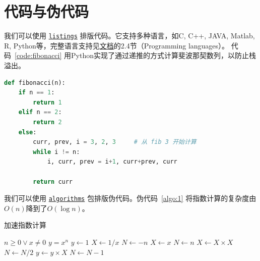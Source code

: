 \documentclass[zihao = -4, linespread = 1.5]{ctexart} %
\begin{document}
\section{代码与伪代码}
我们可以使用 \href{https://ctan.org/pkg/listings?lang=en}{\texttt{listings}} 排版代码。它支持多种语言，如C, C++, JAVA, Matlab, R, Python等，完整语言支持见\href{https://ctan.mirrors.hoobly.com/macros/latex/contrib/listings/listings.pdf}{文档}的2.4节（Programming languages）。
代码~\ref{code:fibonacci} 用Python实现了通过递推的方式计算斐波那契数列，以防止栈溢出。
\begin{lstlisting}[language=Python, caption=计算斐波那契数列,label=code:fibonacci]
def fibonacci(n):
    if n == 1:
        return 1
    elif n == 2:
        return 2
    else:
        curr, prev, i = 3, 2, 3     # 从 fib 3 开始计算
        while i != n:
            i, curr, prev = i+1, curr+prev, curr

        return curr
\end{lstlisting}
% 

我们可以使用 \href{https://ctan.org/pkg/algorithms}{\texttt{algorithms}} 包排版伪代码。伪代码~\ref{algo:1} 将指数计算的复杂度由$O(n)$降到了$O(\log n)$。
\begin{algorithm}
  \caption{加速指数计算}
  \label{algo:1}
  \begin{algorithmic}
  \REQUIRE $n \geq 0 \vee x \neq 0$
  \ENSURE $y = x^n$
  \STATE $y \gets 1$
  \STATE $X \gets 1 / x$
  \STATE $N \gets -n$
  \ELSE
  \STATE $X \gets x$
  \STATE $N \gets n$
  \ENDIF
  \STATE $X \gets X \times X$
  \STATE $N \gets N / 2$
  \ELSE[$N$ is odd]
  \STATE $y \gets y \times X$
  \STATE $N \gets N - 1$
  \ENDIF
  \ENDWHILE
  \end{algorithmic}
\end{algorithm}


%
\end{document}

